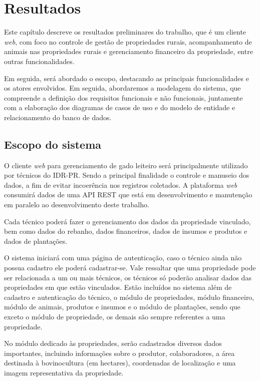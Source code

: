 
\chapter{Resultados}\label{cap:resultados}

Este capítulo descreve os resultados preliminares do trabalho, que é um cliente \textit{web}, com foco no controle de gestão de propriedades rurais, acompanhamento de animais nas propriedades rurais e gerenciamento financeiro da propriedade, entre outras funcionalidades. 

Em seguida, será abordado o escopo, destacando as principais funcionalidades e os atores envolvidos. Em seguida, abordaremos a modelagem do sistema, que compreende a definição dos requisitos funcionais e não funcionais, juntamente com a elaboração dos diagramas de casos de uso e do modelo de entidade e relacionamento do banco de dados.

\section{Escopo do sistema}\label{sec:escopoSistema}

O cliente \textit{web} para gerenciamento de gado leiteiro será principalmente utilizado por técnicos do \gls{IDR-PR}. Sendo a principal finalidade o controle e manuseio dos dados, a fim de evitar incoerência nos registros coletados. A plataforma \textit{web} consumirá dados de uma \gls{API} \gls{REST} que está em desenvolvimento e manutenção em paralelo ao desenvolvimento deste trabalho.

Cada técnico poderá fazer o gerenciamento dos dados da propriedade vinculado, bem como dados do rebanho, dados financeiros, dados de insumos e produtos e dados de plantações.

O sistema iniciará com uma página de autenticação, caso o técnico ainda não possua cadastro ele poderá cadastrar-se. Vale ressaltar que uma propriedade pode ser relacionada a um ou mais técnicos, os técnicos só poderão analisar dados das propriedades em que estão vinculados. Estão incluídos no sistema além de cadastro e autenticação do técnico, o módulo de propriedades, módulo financeiro, módulo de animais, produtos e insumos e o módulo de plantações, sendo que exceto o módulo de propriedade, os demais são sempre referentes a uma propriedade.

No módulo dedicado às propriedades, serão cadastrados diversos dados importantes, incluindo informações sobre o produtor, colaboradores, a área destinada à bovinocultura (em hectares), coordenadas de localização e uma imagem representativa da propriedade.

